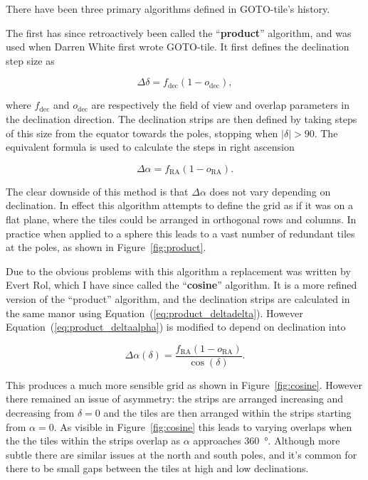 \begin{colsection}
\begin{colsection}
There have been three primary algorithms defined in GOTO-tile's history.

The first has since retroactively been called the ``\textbf{product}'' algorithm, and was used when Darren White first wrote GOTO-tile. It first defines the declination step size as

\begin{equation}
    \Delta\delta = f_\text{dec}(1-o_\text{dec}),
    \label{eq:product_deltadelta}
\end{equation}

where $f_\text{dec}$ and $o_\text{dec}$ are respectively the field of view and overlap parameters in the declination direction. The declination strips are then defined by taking steps of this size from the equator towards the poles, stopping when $|\delta| > 90$. The equivalent formula is used to calculate the steps in right ascension

\begin{equation}
    \Delta\alpha = f_\text{RA}(1-o_\text{RA}).
    \label{eq:product_deltaalpha}
\end{equation}

The clear downside of this method is that $\Delta\alpha$ does not vary depending on declination. In effect this algorithm attempts to define the grid as if it was on a flat plane, where the tiles could be arranged in orthogonal rows and columns. In practice when applied to a sphere this leads to a vast number of redundant tiles at the poles, as shown in Figure~\ref{fig:product}.

Due to the obvious problems with this algorithm a replacement was written by Evert Rol, which I have since called the ``\textbf{cosine}'' algorithm. It is a more refined version of the ``product'' algorithm, and the declination strips are calculated in the same manor using Equation~(\ref{eq:product_deltadelta}). However Equation~(\ref{eq:product_deltaalpha}) is modified to depend on declination into

\begin{equation}
    \Delta\alpha(\delta) = \frac{f_\text{RA}(1-o_\text{RA})}{\cos(\delta)}.
    \label{eq:cosine_deltaalpha}
\end{equation}

This produces a much more sensible grid as shown in Figure~\ref{fig:cosine}. However there remained an issue of asymmetry: the strips are arranged increasing and decreasing from $\delta=0$ and the tiles are then arranged within the strips starting from $\alpha=0$. As visible in Figure~\ref{fig:cosine} this leads to varying overlaps when the the tiles within the strips overlap as $\alpha$ approaches \SI{360}{\degree}. Although more subtle there are similar issues at the north and south poles, and it's common for there to be small gaps between the tiles at high and low declinations.


\end{colsection}
\end{colsection}
